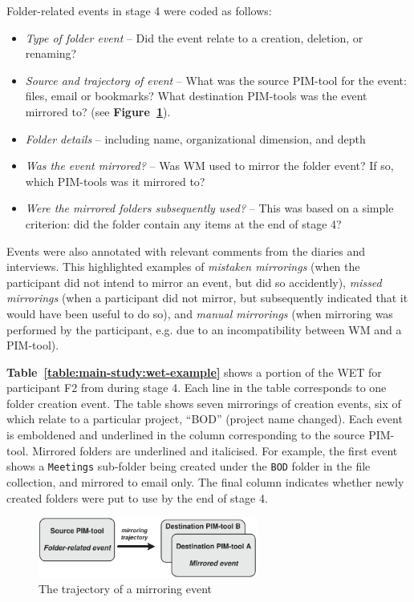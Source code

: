 Folder-related events in stage 4 were coded as follows:
\begin{itemize}
\item \textit{Type of folder event} -- Did the event relate to a creation, deletion, or renaming?
\item \textit{Source and trajectory of event} -- What was the source PIM-tool for the event: files, email or bookmarks?  What destination PIM-tools was the event mirrored to? (see \textbf{Figure~\ref{fig:main-study:trajectory}}).
\item \textit{Folder details} -- including name, organizational dimension, and depth
\item \textit{Was the event mirrored?}  -- Was WM used to mirror the folder event?  If so, which PIM-tools was it mirrored to?
\item \textit{Were the mirrored folders subsequently used?}  -- This was based on a simple criterion: did the folder contain any items at the end of stage 4?
\end{itemize}

Events were also annotated with relevant comments from the diaries and interviews. This highlighted examples of \textit{mistaken mirrorings} (when the participant did not intend to mirror an event, but did so accidently), \textit{missed mirrorings} (when a participant did not mirror, but subsequently indicated that it would have been useful to do so), and \textit{manual mirrorings} (when mirroring was performed by the participant, e.g. due to an incompatibility between WM and a PIM-tool).

\textbf{Table~\ref{table:main-study:wet-example}} shows a portion of the WET for participant F2 from during stage 4.  Each line in the table corresponds to one folder creation event.  The table shows seven mirrorings of creation events, six of which relate to a particular project, ``BOD'' (project name changed).   Each event is emboldened and underlined in the column corresponding to the source PIM-tool.  Mirrored folders are underlined and italicised.  For example, the first event shows a \texttt{Meetings} sub-folder being created under the \texttt{BOD} folder in the file collection, and mirrored to email only.   The final column indicates whether newly created folders were put to use by the end of stage 4.


\begin{figure}[t]
	\begin{center}
		\leavevmode
		\includegraphics[height=2cm]{pictures/main-study/trajectory.pdf}
	\end{center}
	\caption{The trajectory of a mirroring event}
	\label{fig:main-study:trajectory}
\end{figure}

